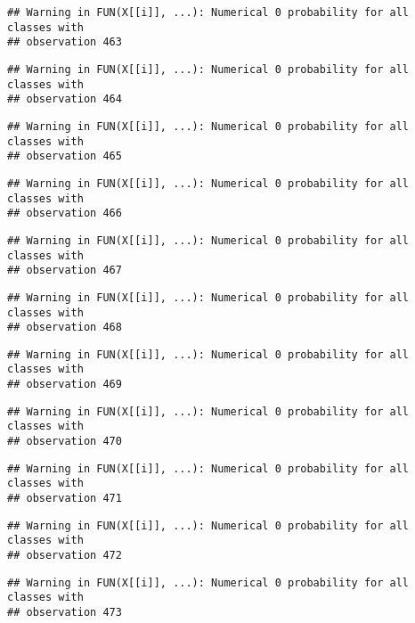 \documentclass[
]{article}
\begin{document}
\begin{verbatim}
## Warning in FUN(X[[i]], ...): Numerical 0 probability for all classes with
## observation 463
\end{verbatim}

\begin{verbatim}
## Warning in FUN(X[[i]], ...): Numerical 0 probability for all classes with
## observation 464
\end{verbatim}

\begin{verbatim}
## Warning in FUN(X[[i]], ...): Numerical 0 probability for all classes with
## observation 465
\end{verbatim}

\begin{verbatim}
## Warning in FUN(X[[i]], ...): Numerical 0 probability for all classes with
## observation 466
\end{verbatim}

\begin{verbatim}
## Warning in FUN(X[[i]], ...): Numerical 0 probability for all classes with
## observation 467
\end{verbatim}

\begin{verbatim}
## Warning in FUN(X[[i]], ...): Numerical 0 probability for all classes with
## observation 468
\end{verbatim}

\begin{verbatim}
## Warning in FUN(X[[i]], ...): Numerical 0 probability for all classes with
## observation 469
\end{verbatim}

\begin{verbatim}
## Warning in FUN(X[[i]], ...): Numerical 0 probability for all classes with
## observation 470
\end{verbatim}

\begin{verbatim}
## Warning in FUN(X[[i]], ...): Numerical 0 probability for all classes with
## observation 471
\end{verbatim}

\begin{verbatim}
## Warning in FUN(X[[i]], ...): Numerical 0 probability for all classes with
## observation 472
\end{verbatim}

\begin{verbatim}
## Warning in FUN(X[[i]], ...): Numerical 0 probability for all classes with
## observation 473
\end{verbatim}
\end{document}
